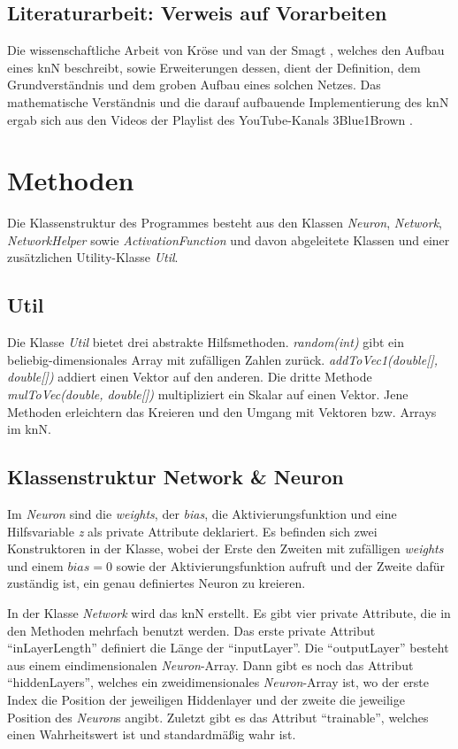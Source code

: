 \documentclass[paper=A4,pagesize=auto,12pt,headinclude=true,footinclude=true,BCOR=0mm,DIV=calc]{scrartcl}
\begin{document}
\subsection{Literaturarbeit: Verweis auf Vorarbeiten}
Die wissenschaftliche Arbeit von Kröse und van der Smagt \cite{script}, welches den Aufbau eines knN beschreibt, sowie Erweiterungen dessen, dient der Definition, dem Grundverständnis und dem groben Aufbau eines solchen Netzes.
Das mathematische Verständnis und die darauf aufbauende Implementierung des knN ergab sich aus den Videos 
der Playlist des YouTube-Kanals 3Blue1Brown \cite{3b1b}.

\newpage


\section{Methoden}
Die Klassenstruktur des Programmes besteht aus den Klassen \textit{Neuron}, \textit{Network}, \textit{NetworkHelper} sowie \textit{ActivationFunction} und davon abgeleitete Klassen und einer zusätzlichen Utility-Klasse \textit{Util}.

\subsection{Util}
Die Klasse \textit{Util} bietet drei abstrakte Hilfsmethoden. \textit{random(int)} gibt ein beliebig-dimensionales Array mit zufälligen Zahlen zurück. \textit{addToVec1(double[], double[])} addiert einen Vektor auf den anderen. Die dritte Methode \textit{mulToVec(double, double[])} multipliziert ein Skalar auf einen Vektor. Jene Methoden erleichtern das Kreieren und den Umgang mit Vektoren bzw. Arrays im knN.


\subsection{Klassenstruktur Network \& Neuron} %
Im \textit{Neuron} sind die \textit{weights}, der \textit{bias}, die Aktivierungsfunktion und eine Hilfsvariable \textit{z} als private Attribute deklariert.
Es befinden sich zwei Konstruktoren in der Klasse, wobei der Erste den Zweiten mit zufälligen \textit{weights} und einem $bias=0$ sowie der Aktivierungsfunktion aufruft und der Zweite dafür zuständig ist, ein genau definiertes Neuron zu kreieren.

In der Klasse \textit{Network} wird das knN erstellt.
Es gibt vier private Attribute, die in den Methoden mehrfach benutzt werden. Das erste private Attribut “inLayerLength” definiert die Länge der “inputLayer”. Die “outputLayer” besteht aus einem eindimensionalen \textit{Neuron}-Array. Dann gibt es noch das Attribut “hiddenLayers”, welches ein zweidimensionales \textit{Neuron}-Array ist, wo der erste Index die Position der jeweiligen Hiddenlayer und der zweite die jeweilige Position des \textit{Neuron}s angibt. Zuletzt gibt es das Attribut “trainable”, welches einen Wahrheitswert ist und standardmäßig wahr ist.
\end{document}
